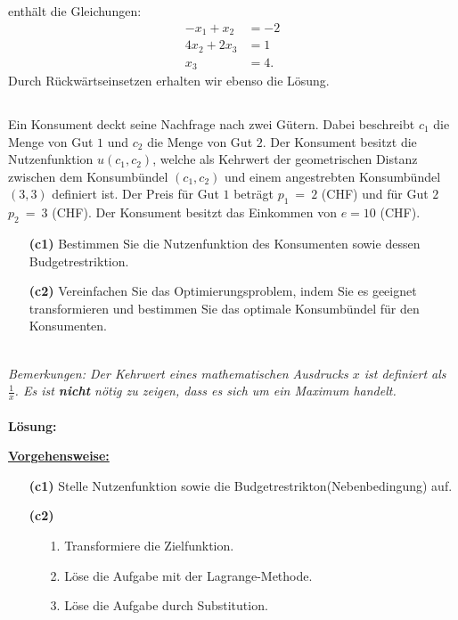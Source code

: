 enthält die Gleichungen:
\begin{align*}
	-x_1 + x_2 &= -2 \\
	4 x_2 + 2 x_3 &= 1 \\
	x_3 &= 4.
\end{align*}
Durch Rückwärtseinsetzen erhalten wir ebenso die Lösung.
\newpage
\subsection*{}
Ein Konsument deckt seine Nachfrage nach zwei Gütern. Dabei beschreibt $ c_1 $ die Menge von Gut $ 1 $ und $ c_2 $ die Menge von Gut $ 2 $. Der Konsument besitzt die Nutzenfunktion $ u(c_1,c_2) $, welche als Kehrwert der geometrischen Distanz zwischen dem Konsumbündel $ (c_1,c_2) $ und einem angestrebten Konsumbündel $ (3,3) $ definiert ist. Der Preis für Gut $ 1 $ beträgt $ p_1 \ = \ 2 $ (CHF) und für Gut $ 2 $ $ p_2 \ = \ 3 $ (CHF). Der Konsument besitzt das Einkommen von $ e = 10 $ (CHF).
\begin{enumerate}
	\item[\textbf{(c1)}] 
	Bestimmen Sie die Nutzenfunktion des Konsumenten sowie dessen Budgetrestriktion.
	\item[\textbf{(c2)}]
	Vereinfachen Sie das Optimierungsproblem, indem Sie es geeignet transformieren und bestimmen Sie das optimale Konsumbündel für den Konsumenten.
\end{enumerate}
\ \\
\textit{Bemerkungen: Der Kehrwert eines mathematischen Ausdrucks $ x $ ist definiert als $ \frac{1}{x} $. Es ist \textbf{nicht} nötig zu zeigen, dass es sich um ein Maximum handelt.}
\\ \\
\textbf{Lösung:}
\begin{mdframed}
\underline{\textbf{Vorgehensweise:}}
\begin{enumerate}
\item[\textbf{(c1)}] Stelle Nutzenfunktion sowie die Budgetrestrikton(Nebenbedingung) auf.
\item[\textbf{(c2)}]
\begin{enumerate}
	\item[1.] Transformiere die Zielfunktion.
	\item[2.] Löse die Aufgabe mit der Lagrange-Methode.
	\item[3.] Löse die Aufgabe durch Substitution.
\end{enumerate}
\end{enumerate}
\end{mdframed}

